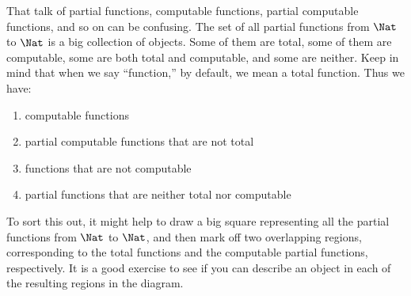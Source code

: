 \documentclass[../../include/open-logic-section]{subfiles}
\begin{document}
That talk of partial functions, computable functions,
partial computable functions, and so on can be confusing. The set of
all partial functions from $\Nat$ to $\Nat$ is a big collection of
objects. Some of them are total, some of them are computable, some are
both total and computable, and some are neither. Keep in mind that
when we say ``function,'' by default, we mean a total function. Thus we
have:
\begin{enumerate}
\item computable functions
\item partial computable functions that are not total
\item functions that are not computable
\item partial functions that are neither total nor computable
\end{enumerate}
To sort this out, it might help to draw a big square representing all
the partial functions from $\Nat$ to $\Nat$, and then mark off two
overlapping regions, corresponding to the total functions and the
computable partial functions, respectively. It is a good exercise to
see if you can describe an object in each of the resulting regions in
the diagram.
\end{document}
